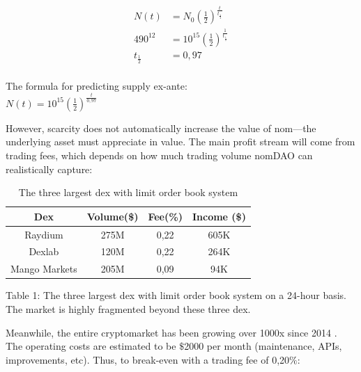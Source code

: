 \documentclass[12pt]{article}
\begin{document}
\begin{equation}\label{decay}
\begin{split}
N(t)&=N_{0}(\frac{1}{2})^\frac{t}{t_{\frac{1}{2}}}\\
490^{12}&=10^{15}(\frac{1}{2})^\frac{1}{t_{\frac{1}{2}}}\\
{t_{\frac{1}{2}}} & = 0,97
\end{split}
\end{equation}
\\

The formula for predicting supply ex-ante:\\

$N(t)=10^{15}(\frac{1}{2})^\frac{t}{0,97}$


However, scarcity does not automatically increase the value of nom—the underlying asset must appreciate in value. The main profit stream will come from trading fees, which depends on how much trading volume nomDAO can realistically capture:

\begin{table}[ht]
\caption{The three largest dex with limit order book system}
\centering
\begin{tabular}{||c c c c||} 
 \hline
Dex & Volume(\$) &  Fee(\%) & Income (\$) \\ [0.5ex] 
 \hline\hline
 Raydium \cite{raydium} & 275M & 0,22 \cite{serum} & 605K \\ 
 \hline
 Dexlab \cite{dexlab} & 120M & 0,22 \cite{dexfee} & 264K \\
 \hline
Mango Markets \cite{mango} & 205M & 0,09 & 94K \\
 \hline
\end{tabular}
\label{Table 1}

Table 1: The three largest dex with limit order book system on a 24-hour basis. The market is highly fragmented beyond these three dex.
\end{table}

Meanwhile, the entire cryptomarket has been growing over 1000x since 2014 \cite{cryptovolume}. The operating costs are estimated to be $\$$2000 per month (maintenance, APIs, improvements, etc). Thus, to break-even with a trading fee of 0,20$\%$:
\end{document}
